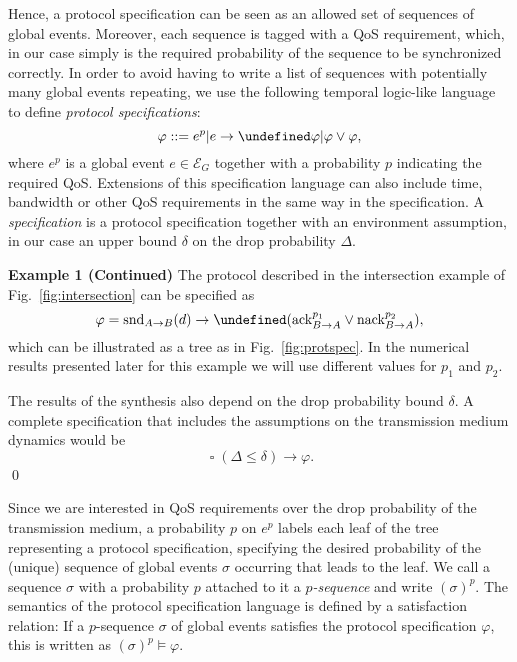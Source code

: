 \documentclass{sig-alternate}
\newenvironment{excont}[1]{\textbf{Example 1 (#1)}}{\qed}
\let\next\undefined
\DeclareMathOperator{\next}{\mathop\bigcirc}
\DeclareMathOperator{\always}{\mathop\square}
\renewcommand{\v}{\varphi}
\renewcommand{\d}{\delta}
\newcommand{\dropprob}{\Delta}
\newcommand{\G}{\mathcal{E}_G}
\newcommand{\snd}{\mathrm{snd}}
\newcommand{\ack}{\mathrm{ack}}
\newcommand{\nack}{\mathrm{nack}}
\newcommand{\glob}[4]{{#1}_{{#2} \rightarrow {#3}}(#4)}
\newcommand{\eglob}[3]{{#1}_{{#2} \rightarrow {#3}}}
\newcommand{\define}{\sl}
\newcommand{\fig}[1]{Fig.\ \ref{fig:#1}}
\begin{document}
Hence, a protocol specification can be seen as an allowed set of sequences of global events. Moreover, each sequence is tagged with a QoS requirement, which, in our case simply is the required probability of the sequence to be synchronized correctly. In order to avoid having to write a list of sequences with potentially many global events repeating, we use the following temporal logic-like language to define {\define protocol specifications}:
\begin{equation*}
	\v ::=  e^p | e \rightarrow \next\v | \v \vee \v,
\end{equation*}
where $e^p$ is a global event $e \in \G$ together with a probability $p$ indicating the required QoS. Extensions of this specification language can also include time, bandwidth or other QoS requirements in the same way in the specification. A {\define specification} is a protocol specification together with an environment assumption, in our case an upper bound $\d$ on the drop probability $\dropprob$.


\begin{excont}{Continued}
The protocol described in the intersection example of \fig{intersection} can be specified as
\begin{equation}
	\v = \glob{\snd}{A}{B}{d} \rightarrow \next (\eglob{\ack}{B}{A}^{p_1} \vee \eglob{\nack}{B}{A}^{p_2}), \label{eq:protspec}
\end{equation}
which can be illustrated as a tree as in \fig{protspec}. In the numerical results presented later for this example we will use different values for $p_1$ and $p_2$. 

The results of the synthesis also depend on the drop probability bound $\d$. A complete specification that includes the assumptions on the transmission medium dynamics would be
\begin{equation}
	\always(\dropprob \leq \d) \rightarrow \v.
\end{equation}
\end{excont}

Since we are interested in QoS requirements over the drop probability of the transmission medium, a probability $p$ on $e^p$ labels each leaf of the tree representing a protocol specification, specifying the desired probability of the (unique) sequence of global events $\sigma$ occurring that leads to the leaf. We call a sequence $\sigma$ with a probability $p$ attached to it a {\define $p$-sequence} and write $(\sigma)^p$. The semantics of the protocol specification language is defined by a satisfaction relation: If a $p$-sequence $\sigma$ of global events satisfies the protocol specification $\v$, this is written as $(\sigma)^p \models \v$.
\end{document}

